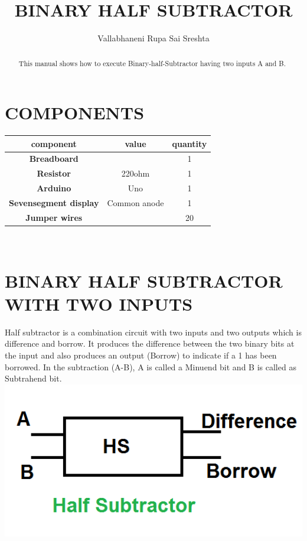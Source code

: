 \documentclass{article}
\title{\textbf{BINARY HALF SUBTRACTOR}}
\author{Vallabhaneni Rupa Sai Sreshta}
\begin{document}
\maketitle
\begin{tableofcontents}
\begin{abstract}
This manual shows how to execute Binary-half-Subtractor having two inputs A and B.
\end{abstract}
\section{COMPONENTS}
\begin{tabular}{|c||c||c|}
\hline
\textbf{component} & {value} & {quantity} \\
\hline
 \textbf{Breadboard}  &  &  1  \\
 \hline
 \textbf{Resistor}  & {220ohm} & {1} \\
 \hline
 \textbf{Arduino} & {Uno} & 1\\
 \hline
 \textbf{Sevensegment display} & {Common anode} & {1}\\
 \hline
 \textbf{Jumper wires} &   &  {20}\\
 \hline
\end{tabular}
\\
\section{BINARY HALF SUBTRACTOR WITH TWO INPUTS}
Half subtractor is a combination circuit with two inputs and two outputs which is difference and borrow. It produces the difference between the two binary bits at the input and also produces an output (Borrow) to indicate if a 1 has been borrowed. In the subtraction (A-B), A is called a Minuend bit and B is called as Subtrahend bit.
\newline
\\

\centering
\includegraphics[scale=0.5]{bhs.png} 
\\



\end{tableofcontents}
\end{document}
